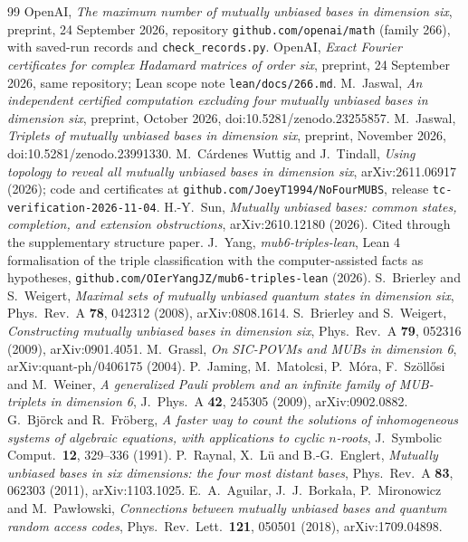 \documentclass[11pt]{article}
\theoremstyle{definition}
\theoremstyle{remark}
\begin{document}
\begin{thebibliography}{99}\small
{} OpenAI, \emph{The maximum number of mutually unbiased bases in dimension six}, preprint, 24 September 2026, repository \texttt{github.com/openai/math} (family 266), with saved-run records and \texttt{check\_records.py}.
 OpenAI, \emph{Exact Fourier certificates for complex Hadamard matrices of order six}, preprint, 24 September 2026, same repository; Lean scope note \texttt{lean/docs/266.md}.
 M.~Jaswal, \emph{An independent certified computation excluding four mutually unbiased bases in dimension six}, preprint, October 2026, doi:10.5281/zenodo.23255857.
 M.~Jaswal, \emph{Triplets of mutually unbiased bases in dimension six}, preprint, November 2026, doi:10.5281/zenodo.23991330.
 M.~C\'ardenes Wuttig and J.~Tindall, \emph{Using topology to reveal all mutually unbiased bases in dimension six}, arXiv:2611.06917 (2026); code and certificates at \texttt{github.com/JoeyT1994/NoFourMUBS}, release \texttt{tc-verification-2026-11-04}.
 H.-Y.~Sun, \emph{Mutually unbiased bases: common states, completion, and extension obstructions}, arXiv:2610.12180 (2026). Cited through the supplementary structure paper.
 J.~Yang, \emph{mub6-triples-lean}, Lean 4 formalisation of the triple classification with the computer-assisted facts as hypotheses, \texttt{github.com/OIerYangJZ/mub6-triples-lean} (2026).
 S.~Brierley and S.~Weigert, \emph{Maximal sets of mutually unbiased quantum states in dimension six}, Phys.\ Rev.\ A \textbf{78}, 042312 (2008), arXiv:0808.1614.
 S.~Brierley and S.~Weigert, \emph{Constructing mutually unbiased bases in dimension six}, Phys.\ Rev.\ A \textbf{79}, 052316 (2009), arXiv:0901.4051.
 M.~Grassl, \emph{On SIC-POVMs and MUBs in dimension 6}, arXiv:quant-ph/0406175 (2004).
 P.~Jaming, M.~Matolcsi, P.~M\'ora, F.~Sz\"oll\H{o}si and M.~Weiner, \emph{A generalized Pauli problem and an infinite family of MUB-triplets in dimension 6}, J.\ Phys.\ A \textbf{42}, 245305 (2009), arXiv:0902.0882.
 G.~Bj\"orck and R.~Fr\"oberg, \emph{A faster way to count the solutions of inhomogeneous systems of algebraic equations, with applications to cyclic $n$-roots}, J.\ Symbolic Comput.\ \textbf{12}, 329--336 (1991).
 P.~Raynal, X.~L\"u and B.-G.~Englert, \emph{Mutually unbiased bases in six dimensions: the four most distant bases}, Phys.\ Rev.\ A \textbf{83}, 062303 (2011), arXiv:1103.1025.
 E.~A.~Aguilar, J.~J.~Borka{\l}a, P.~Mironowicz and M.~Paw{\l}owski, \emph{Connections between mutually unbiased bases and quantum random access codes}, Phys.\ Rev.\ Lett.\ \textbf{121}, 050501 (2018), arXiv:1709.04898.

\end{thebibliography}
\end{document}
